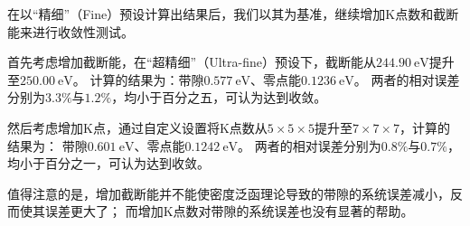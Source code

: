 在以“精细”（Fine）预设计算出结果后，我们以其为基准，继续增加K点数和截断能来进行收敛性测试。

首先考虑增加截断能，在“超精细”（Ultra-fine）预设下，截断能从$\qty{244.90}{\electronvolt}$提升至$\qty{250.00}{\electronvolt}$。
计算的结果为：带隙$\qty{0.577}{\electronvolt}$、零点能$\qty{0.1236}{\electronvolt}$。
两者的相对误差分别为$3.3\%$与$1.2\%$，均小于百分之五，可认为达到收敛。

然后考虑增加K点，通过自定义设置将K点数从$5\times 5 \times 5$提升至$7 \times 7 \times 7$，计算的结果为：
带隙$\qty{0.601}{\electronvolt}$、零点能$\qty{0.1242}{\electronvolt}$。
两者的相对误差分别为$0.8\%$与$0.7\%$，均小于百分之一，可认为达到收敛。

值得注意的是，增加截断能并不能使密度泛函理论导致的带隙的系统误差减小，反而使其误差更大了；
而增加K点数对带隙的系统误差也没有显著的帮助。
